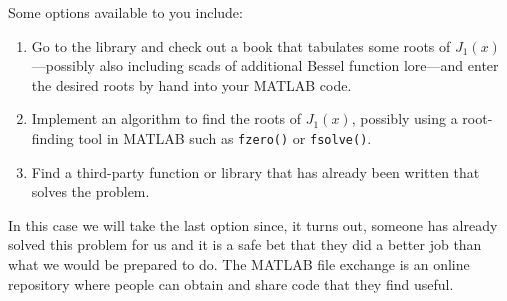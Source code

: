 Some options available to you include:
\begin{enumerate}
\item Go to the library and check out a book that tabulates some roots of $J_{1}(x)$---possibly also including scads of additional Bessel function lore\cite{bowman2012introduction}---and enter the desired roots by hand into your MATLAB code.
\item Implement an algorithm to find the roots of $J_1(x)$, possibly using a root-finding tool in MATLAB such as \lstinline[style=myMatlab]{fzero()} or \lstinline[style=myMatlab]{fsolve()}.
\item Find a third-party function or library that has already been written that solves the problem.
\end{enumerate}
In this case we will take the last option since, it turns out, someone has already solved this problem for us and it is a safe bet that they did a better job than what we would be prepared to do.  The MATLAB file exchange is an online repository where people can obtain and share code that they find useful.

